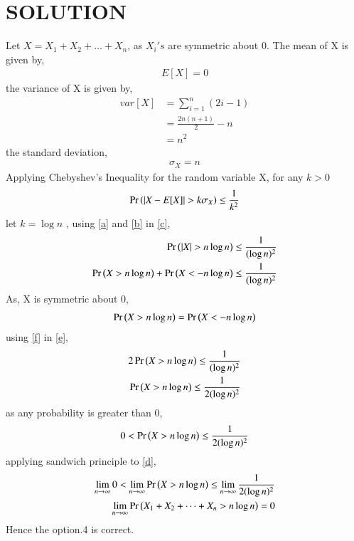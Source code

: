 \documentclass[journal,12pt,twocolumn]{IEEEtran}
\begin{document}
\section{SOLUTION}
Let $X= X_1 +X_2 + \dots + X_n $,
as $X_i 's$ are symmetric about 0.
The mean of X is given by,
\begin{align}
E[X]=0 \label{a}
\end{align}
the variance of X is given by,
\begin{align}
var[X]&= \sum_{i=1}^{n}(2i -1)\\
   &= \frac{2n(n+1)}{2} - n\\
   &= n^{2}
\end{align}
the standard deviation,
\begin{align}
\sigma_X = n \label{b}
\end{align}
Applying Chebyshev's Inequality for the random variable X, for any $k>0$
\begin{align}
\Pr\left(\vert X-E[X]\vert> k\sigma_X\right) \leq \frac{1}{k^{2}} \label{c}
\end{align}
let $k=\log{n} $ ,
using \eqref{a} and \eqref{b} in \eqref{c},
\begin{align}
\Pr\left(\vert X\vert> n\log{n}\right) \leq \frac{1}{(\log{n})^{2}}\\
\Pr\left(X> n\log{n}\right) + \Pr\left(X< -n\log{n}\right) \leq \frac{1}{(\log{n})^{2}} \label{e}
\end{align}
As, X is symmetric about 0,
\begin{align}
\Pr\left(X> n\log{n}\right) =\Pr\left(X< -n\log{n}\right) \label{f}
\end{align}
using \eqref{f} in \eqref{e},
\begin{align}
2\Pr\left(X> n\log{n}\right) \leq \frac{1}{(\log{n})^{2}}\\
\Pr\left(X> n\log{n}\right) \leq \frac{1}{2(\log{n})^{2}}
\end{align}
as any probability is greater than 0,
\begin{align}
0< \Pr\left(X> n\log{n}\right) \leq \frac{1}{2(\log{n})^{2}} \label{d}
\end{align}
applying sandwich principle to \eqref{d},
\begin{align}
\lim_{n \to \infty} 0< \lim_{n \to \infty} \Pr\left(X> n\log{n}\right) \leq \lim_{n \to \infty} \frac{1}{2(\log{n})^{2}}\\
\lim_{n \to \infty}\Pr\left(X_1 +X_2 + \dots + X_n > n\log{n}\right) = 0
\end{align}
Hence the option.4 is correct.
\end{document}
